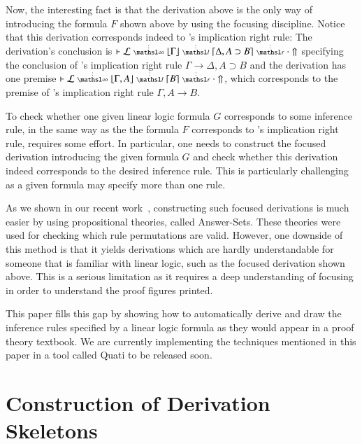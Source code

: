 \documentclass[a4paper,10pt]{article}
\newcommand\lra{\longrightarrow}
\begin{document}
Now, the interesting fact is that the derivation above is the only way of introducing the formula $F$ 
shown above by using the focusing 
discipline. Notice that this derivation corresponds indeed to \mLJ's 
implication right rule: The derivation's conclusion is $\llfDash \lEnc \ndots{\infty}
\lft{\Gamma} \ndots{l} {\rght{\Delta, A \supset B}}
\ndots{r} \cdot \Uparrow$ specifying the conclusion of \mLJ's 
implication right rule $\Gamma \lra \Delta, A \supset B$ and 
the derivation has one premise $\llfDash \lEnc \ndots{\infty} \lft{\Gamma, A} \ndots{l} \rght{B} \ndots{r}
\cdot \Uparrow$, which corresponds to the premise of \mLJ's 
implication right rule $\Gamma, A \lra B$.

To check whether one given linear logic formula $G$ corresponds to some inference rule, in the same way as the 
the formula $F$ corresponds to \mLJ's implication right rule, requires some effort. In particular, one needs
to construct the focused derivation introducing the given formula $G$ and check whether this derivation indeed
corresponds to the desired inference rule. This is particularly challenging as a given formula may specify 
more than one rule. 

As we shown in our recent work~\cite{nigam13iclp}, constructing such focused derivations is 
much easier by using propositional theories, called Answer-Sets. These theories were used for
checking which rule permutations are valid. However, one downside of this method is that it 
yields derivations which are hardly understandable for someone that is familiar with linear logic, 
such as the focused derivation shown above. This is a serious limitation as it requires
a deep understanding of focusing in order to understand the proof figures printed.

This paper fills this gap by showing how to automatically derive and draw the inference rules
specified by a linear logic formula as they would appear in a proof theory textbook. We are currently
implementing the techniques mentioned in this paper in a tool called Quati to be released soon.


\section{Construction of Derivation Skeletons}
\end{document}
